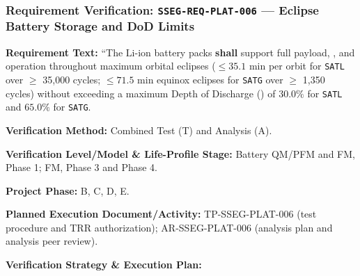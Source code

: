 \subsubsection{Requirement Verification: \texttt{SSEG-REQ-PLAT-006} --- Eclipse Battery Storage and DoD Limits}
\label{ver:SSEG-REQ-PLAT-006}
\textbf{Requirement Text:} ``The  $\mathrm{Li\text{-}ion}$ battery packs \textbf{shall} support full payload, , and  operation throughout maximum orbital eclipses ($\le 35.1\text{ min}$ per orbit for \texttt{SATL} over $\ge$ 35,000 cycles; $\le 71.5\text{ min}$ equinox eclipses for \texttt{SATG} over $\ge$ 1,350 cycles) without exceeding a maximum Depth of Discharge () of $30.0\%$ for \texttt{SATL} and $65.0\%$ for \texttt{SATG}.
\par\textbf{Verification Method:} Combined Test (T) and Analysis (A).
\par\textbf{Verification Level/Model \& Life-Profile Stage:} Battery QM/PFM and FM, Phase 1; FM, Phase 3 and Phase 4.
\par\textbf{Project Phase:} B, C, D, E.
\par\textbf{Planned Execution Document/Activity:} TP-SSEG-PLAT-006 (test procedure and TRR authorization); AR-SSEG-PLAT-006 (analysis plan and analysis peer review).
\par\textbf{Verification Strategy \& Execution Plan:}
